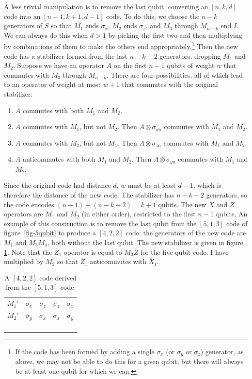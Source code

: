 \documentclass{report}
\newcommand{\X}{\sigma_x}
\newcommand{\Z}{\sigma_z}
\newcommand{\Y}{\sigma_y}
\newcommand{\Xs}[1]{\sigma_{x{#1}}}
\newcommand{\Ys}[1]{\sigma_{y{#1}}}
\newcommand{\Zs}[1]{\sigma_{z{#1}}}
\newcommand{\Xbar}{\overline{X}}
\newcommand{\Zbar}{\overline{Z}}
\newcommand{\low}[1]{\raisebox{-0.3ex}{{#1}}}
\begin{document}
A less trivial manipulation is to remove the last qubit, converting an $[n, k, 
d]$ code into an $[n-1, k+1, d-1]$ code.  To do this, we choose the $n-k$ 
generators of $S$ so that $M_1$ ends $\X$, $M_2$ ends $\Z$, and $M_3$ 
through $M_{n-k}$ end $I$.  We can always do this when $d>1$ by picking 
the first two and then multiplying by combinations of them to make the 
others end appropriately.\footnote{If the code has been formed by adding 
a single $\X$ (or $\Y$ or $\Z$) generator, as above, we may not be able to 
do this for a given qubit, but there will always be at least one qubit for 
which we can.}  Then the new code has a stabilizer formed from the last 
$n-k-2$ generators, dropping $M_1$ and $M_2$.  Suppose we have an 
operator $A$ on the first $n-1$ qubits of weight $w$ that commutes with 
$M_3$ through $M_{n-k}$.  There are four possibilities, all of which lead to 
an operator of weight at most $w+1$ that commutes with the original 
stabilizer:
\begin{enumerate}
\item $A$ commutes with both $M_1$ and $M_2$.  
\item $A$ commutes with $M_1$, but not $M_2$.  Then $A \otimes \Xs{n}$ 
commutes with $M_1$ and $M_2$.
\item $A$ commutes with $M_2$, but not $M_1$.  Then $A \otimes \Zs{n}$ 
commutes with $M_1$ and $M_2$.
\item $A$ anticommutes with both $M_1$ and $M_2$.  Then $A \otimes 
\Ys{n}$ commutes with $M_1$ and $M_2$.
\end{enumerate}
Since the original code had distance $d$, $w$ must be at least $d-1$, 
which is therefore the distance of the new code.  The stabilizer has $n-k-2$ 
generators, so the code encodes $(n-1)-(n-k-2) = k+1$ qubits.  The new $\Xbar$
and $\Zbar$ operators are $M_1$ and $M_2$ (in either order), restricted to
the first $n-1$ qubits.  An example of this construction is to remove the
last qubit from the $[5,1,3]$ code of figure~\ref{fig-5qubit} to produce
a $[4,2,2]$ code: the generators of the new code are $M_1$ and $M_3 M_4$,
both without the last qubit.  The new stabilizer is given in figure
\ref{fig-droplast}.  Note that the $\Zbar_1$ operator is equal to
$M_3 \Zbar$ for the five-qubit code.  I have multiplied by $M_3$ so that 
$\Zbar_1$ anticommutes with $\Xbar_1$.
\begin{table}
\centering
\begin{tabular}{c|cccc}
$M_1'$ & $\X$ & $\Z$ & $\Z$ & $\X$ \\
$M_2'$ & $\Y$ & $\X$ & $\X$ & $\Y$ \\
\hline
\low{$\Xbar_1$} & \low{$\X$} & \low{$\X$} & \low{$\X$} & \low{$\X$} \\
\low{$\Xbar_2$} & \low{$\X$} & \low{$I$} & \low{$\X$} & \low{$\Z$} \\
\low{$\Zbar_1$} & \low{$\Y$} & \low{$\Z$} & \low{$\Y$} & \low{$I$} \\
\low{$\Zbar_2$} & \low{$I$} & \low{$\X$} & \low{$\Z$} & \low{$\Z$}
\end{tabular}
\caption{A $[4,2,2]$ code derived from the $[5,1,3]$ code.}
\label{fig-droplast}
\end{table}
\end{document}
